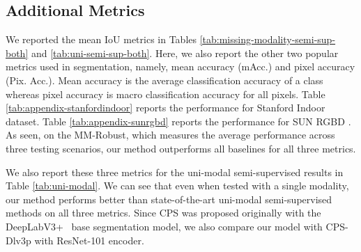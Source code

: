 \documentclass[10pt,twocolumn,letterpaper]{article}
\begin{document}
\subsection{Additional Metrics}
We reported the mean IoU metrics in Tables \ref{tab:missing-modality-semi-sup-both} and \ref{tab:uni-semi-sup-both}. Here, we also report the other two popular metrics used in segmentation, namely, mean accuracy (mAcc.) and pixel accuracy (Pix. Acc.). Mean accuracy is the average  classification accuracy of a class whereas pixel accuracy is macro classification accuracy for all pixels. Table \ref{tab:appendix-stanfordindoor} reports the performance for Stanford Indoor \cite{stanfordindoor} dataset. Table \ref{tab:appendix-sunrgbd} reports the performance for SUN RGBD \cite{sunrgbd}. As seen, on the MM-Robust, which measures the average performance across three testing scenarios, our method outperforms all baselines for all three metrics.  

We also report these three metrics for the uni-modal semi-supervised results in Table \ref{tab:uni-modal}. We can see that even when tested with a single modality, our method performs better than state-of-the-art uni-modal semi-supervised methods on all three metrics. Since CPS \cite{chen2021-CPS} was proposed originally with the DeepLabV3+~\cite{chen2017rethinking} base segmentation model, we also compare our model with CPS-Dlv3p with ResNet-101 encoder.
\end{document}
